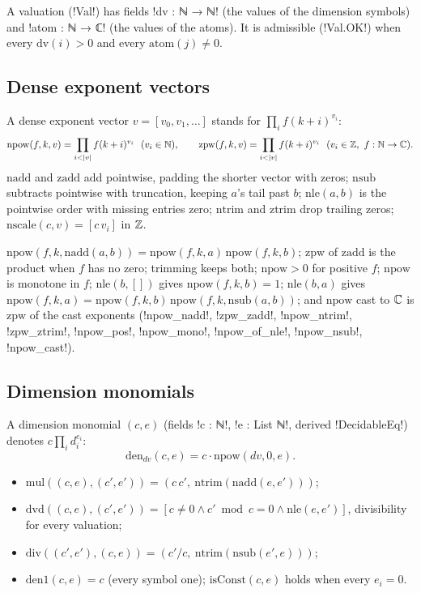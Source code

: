 \begin{definition}[Valuation]
A valuation (\lean!Val!) has fields \lean!dv : ℕ → ℕ! (the values of the dimension symbols) and \lean!atom : ℕ → ℂ! (the values of the atoms). It is admissible (\lean!Val.OK!) when every $\mathrm{dv}(i)>0$ and every $\mathrm{atom}(j)\neq0$.
\end{definition}

\subsection{Dense exponent vectors}

A dense exponent vector $v=[v_0,v_1,\dots]$ stands for $\prod_i f(k+i)^{v_i}$:
\[
\mathrm{npow}(f,k,v)=\prod_{i<|v|}f(k+i)^{v_i}\ \ (v_i\in\N),\qquad \mathrm{zpw}(f,k,v)=\prod_{i<|v|}f(k+i)^{v_i}\ \ (v_i\in\Z,\ f:\N\to\C).
\]
$\mathrm{nadd}$ and $\mathrm{zadd}$ add pointwise, padding the shorter vector with zeros; $\mathrm{nsub}$ subtracts pointwise with truncation, keeping $a$'s tail past $b$; $\mathrm{nle}(a,b)$ is the pointwise order with missing entries zero; $\mathrm{ntrim}$ and $\mathrm{ztrim}$ drop trailing zeros; $\mathrm{nscale}(c,v)=[c\,v_i]$ in $\mathbb{Z}$.

\begin{proposition}
$\mathrm{npow}(f,k,\mathrm{nadd}(a,b))=\mathrm{npow}(f,k,a)\,\mathrm{npow}(f,k,b)$; $\mathrm{zpw}$ of $\mathrm{zadd}$ is the product when $f$ has no zero; trimming keeps both; $\mathrm{npow}>0$ for positive $f$; $\mathrm{npow}$ is monotone in $f$; $\mathrm{nle}(b,[])$ gives $\mathrm{npow}(f,k,b)=1$; $\mathrm{nle}(b,a)$ gives $\mathrm{npow}(f,k,a)=\mathrm{npow}(f,k,b)\,\mathrm{npow}(f,k,\mathrm{nsub}(a,b))$; and $\mathrm{npow}$ cast to $\mathbb{C}$ is $\mathrm{zpw}$ of the cast exponents (\lean!npow_nadd!, \lean!zpw_zadd!, \lean!npow_ntrim!, \lean!zpw_ztrim!, \lean!npow_pos!, \lean!npow_mono!, \lean!npow_of_nle!, \lean!npow_nsub!, \lean!npow_cast!).
\end{proposition}

\subsection{Dimension monomials}

\begin{definition}
A dimension monomial $(c,e)$ (fields \lean!c : ℕ!, \lean!e : List ℕ!, derived \lean!DecidableEq!) denotes $c\prod_i d_i^{e_i}$:
\[
\mathrm{den}_{dv}(c,e)=c\cdot\mathrm{npow}(dv,0,e).
\]
\begin{itemize}
\item $\mathrm{mul}((c,e),(c',e'))=(c\,c',\ \mathrm{ntrim}(\mathrm{nadd}(e,e')))$;
\item $\mathrm{dvd}((c,e),(c',e'))=[c\neq0\land c'\bmod c=0\land\mathrm{nle}(e,e')]$, divisibility for every valuation;
\item $\mathrm{div}((c',e'),(c,e))=(c'/c,\ \mathrm{ntrim}(\mathrm{nsub}(e',e)))$;
\item $\mathrm{den1}(c,e)=c$ (every symbol one); $\mathrm{isConst}(c,e)$ holds when every $e_i=0$.
\end{itemize}
\end{definition}

